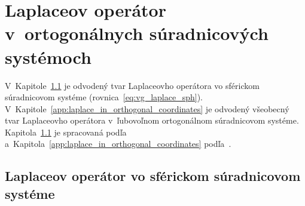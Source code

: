 \documentclass[a4paper, 12pt]{book}
\begin{document}
\chapter{Laplaceov operátor v~ortogonálnych súradnicových systémoch}
\label{app:laplace_in_spherical_coordinates}

V~Kapitole~\ref{app:laplace_in_spherical_system} je odvodený tvar Laplaceovho 
operátora vo sférickom súradnicovom systéme (rovnica~\ref{eq:vg_laplace_sph}).  
V~Kapitole~\ref{app:laplace_in_orthogonal_coordinates} je odvodený všeobecný 
tvar Laplaceovho operátora v~ľubovoľnom ortogonálnom súradnicovom systéme.  
Kapitola~\ref{app:laplace_in_spherical_system} je spracovaná 
podľa~\textcite{MichelLectures} 
a~Kapitola~\ref{app:laplace_in_orthogonal_coordinates} 
podľa~\textcite{SansoGeoidDetermination}.


\section{Laplaceov operátor vo sférickom súradnicovom systéme}
\label{app:laplace_in_spherical_system}
\end{document}
